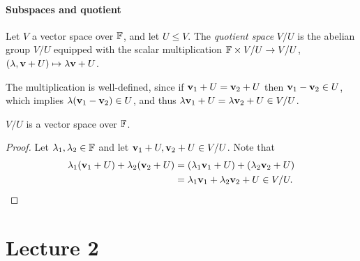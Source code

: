 \documentclass[a4paper]{article}
\begin{document}
\subsection{Subspaces and quotient}
\begin{definition}[Quotient]
    Let $V$ a vector space over ${\mathbb{F}}$, and let $U \leq V$. The \emph{quotient space} $V/U$ is the abelian group $V/U$ equipped with the scalar multiplication ${\mathbb{F}} \times V/U \rightarrow V/U$, $(\lambda, {\bf v} + U) \mapsto \lambda {\bf v} + U$.
\end{definition}
The multiplication is well-defined, since if $ {\bf v}_1+U={\bf v}_2+U $ then $ {\bf v}_1-{\bf v}_2\in U $, which implies $ \lambda({\bf v}_1-{\bf v}_2) \in U$, and thus $ \lambda{\bf v}_1+U=\lambda{\bf v}_2+U\in V/U $.
\begin{proposition}
    $V/U$ is a vector space over ${\mathbb{F}}$.
\end{proposition}
\begin{proof}
    Let $ \lambda_1,\lambda_2\in {\mathbb{F}} $ and let $ {\bf v}_1+U,{\bf v}_2+U\in V/U $. Note that 
    \begin{align*}
        \lambda_1({\bf v}_1+U)+\lambda_2({\bf v}_2+U) &= (\lambda_1{\bf v}_1+U)+(\lambda_2{\bf v}_2+U)\\ 
        &= \lambda_1{\bf v}_1+\lambda_2{\bf v}_2+U\in V/U.\qedhere
    \end{align*}
\end{proof}
\newpage
\part*{Lecture 2}
\end{document}
